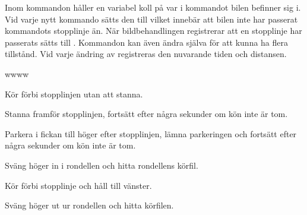\documentclass[tekniskrapport/tech.tex]{subfiles}
\begin{document}
Inom kommandon håller en variabel  koll på var i kommandot bilen
befinner sig i. Vid varje nytt kommando sätts den till 
vilket innebär att bilen inte har passerat kommandots stopplinje än. När
bildbehandlingen registrerar att en stopplinje har passerats sätts 
till . Kommandon kan även ändra  själva för att
kunna ha flera tillstånd. Vid varje ändring av  registreras den
nuvarande tiden och distansen.

\begin{labeling}{wwww}
    \item[\commIgnore] Kör förbi stopplinjen utan att stanna.
    \item[\commStop] Stanna framför stopplinjen, fortsätt efter några sekunder
    om kön inte är tom.
    \item[\commPark] Parkera i fickan till höger efter stopplinjen, lämna
    parkeringen och fortsätt efter några sekunder om kön inte är tom.
    \item[\commEnter] Sväng höger in i rondellen och hitta rondellens körfil.
    \item[\commContinue] Kör förbi stopplinje och håll till vänster.
    \item[\commExit] Sväng höger ut ur rondellen och hitta körfilen.
\end{labeling}
\end{document}
